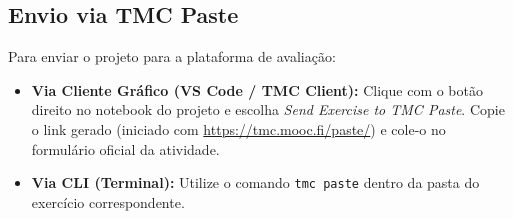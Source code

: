 \documentclass[11pt,a4paper]{article}
\begin{document}
\subsection{Envio via TMC Paste}
Para enviar o projeto para a plataforma de avaliação:
\begin{itemize}
    \item \textbf{Via Cliente Gráfico (VS Code / TMC Client):} Clique com o botão direito no notebook do projeto e escolha \textit{Send Exercise to TMC Paste}. Copie o link gerado (iniciado com \url{https://tmc.mooc.fi/paste/}) e cole-o no formulário oficial da atividade.
    \item \textbf{Via CLI (Terminal):} Utilize o comando \texttt{tmc paste} dentro da pasta do exercício correspondente.
\end{itemize}
\end{document}
